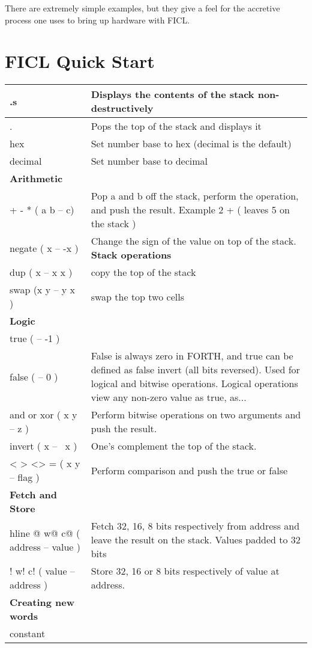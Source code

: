There are extremely simple examples, but they give a feel for the accretive
process one uses to bring up hardware with FICL.

\section{FICL Quick Start}
\begin{tabular}{| l | l |}
	\hline
	.s & Displays the contents of the stack non-destructively \\ \hline
	. & Pops the top of the stack and displays it \\ \hline
	hex & Set number base to hex (decimal is the default) \\ \hline
	decimal & Set number base to decimal \\ \hline
	\textbf{Arithmetic} \\ \hline
	+ - * ( a b -- c) & Pop a and b off the stack, perform the operation, and push the result. Example\newline
	3 2 + ( leaves 5 on the stack ) \\ \hline
	negate ( x -- -x ) & Change the sign of the value on top of the stack.
	\textbf{Stack operations} \\ \hline
	dup ( x -- x x ) & copy the top of the stack \\ \hline
	swap (x y -- y x ) & swap the top two cells \\ \hline
	\textbf{Logic} \\ \hline
	true ( -- -1 ) & \\ \hline
	false ( -- 0 ) & False is always zero in FORTH, and true can be
	defined as false invert (all bits reversed). Used for logical
	and bitwise operations. Logical operations view any non-zero
	value as true, as... \\ \hline
	and or xor ( x y -- z ) & Perform bitwise operations on two
	arguments and push the result. \\ \hline
	invert ( x -- ~x ) & One's complement the top of the stack. \\ \hline
	< > <> = ( x y -- flag ) & Perform comparison and push the true or false \\ \hline
	\textbf{Fetch and Store} \\ hline
	@ w@ c@ ( address -- value ) & Fetch 32, 16, 8 bits respectively
	from address and leave the result on the stack. Values padded to
	32 bits \\ \hline
	! w! c! ( value -- address ) & Store 32, 16 or 8 bits respectively
	of value at address. \\ \hline
	\textbf{Creating new words} \\ \hline
	constant 
\end{tabular}
